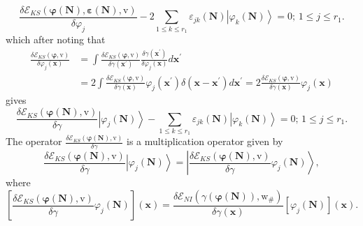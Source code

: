 \documentclass[aps,preprint]{revtex4}%
\begin{document}
\begin{equation}
\frac{\delta\mathcal{E}_{KS}\left(  \mathbf{\varphi}\left(  \mathbf{N}\right)
,\mathbf{\varepsilon}\left(  \mathbf{N}\right)  ,\mathrm{v}\right)  }%
{\delta\varphi_{j}}-2\sum_{1\leq k\leq r_{1}}\varepsilon_{jk}\left(
\mathbf{N}\right)  \left\vert \varphi_{k}\left(  \mathbf{N}\right)
\right\rangle =0;\,1\leq j\leq r_{1}.
\end{equation}
which after noting that
\begin{align}
\frac{\delta\mathcal{E}_{KS}\left(  \mathbf{\varphi,}\mathrm{v}\right)
}{\delta\varphi_{j}\left(  \mathbf{x}\right)  }  &  =\int\frac{\delta
\mathcal{E}_{KS}\left(  \mathbf{\varphi,}\mathrm{v}\right)  }{\delta
\gamma\left(  \mathbf{x}^{\prime}\right)  }\frac{\delta\gamma\left(
\mathbf{x}^{\prime}\right)  }{\delta\varphi_{j}\left(  \mathbf{x}\right)
}d\mathbf{x}^{\prime}\nonumber\\
&  =2\int\frac{\delta\mathcal{E}_{KS}\left(  \mathbf{\varphi,}\mathrm{v}%
\right)  }{\delta\gamma\left(  \mathbf{x}\right)  }\varphi_{j}\left(
\mathbf{x}^{\prime}\right)  \delta\left(  \mathbf{x-x}^{\prime}\right)
d\mathbf{x}^{\prime}=2\frac{\delta\mathcal{E}_{KS}\left(  \mathbf{\varphi
,}\mathrm{v}\right)  }{\delta\gamma\left(  \mathbf{x}\right)  }\varphi
_{j}\left(  \mathbf{x}\right)
\end{align}
gives%
\begin{equation}
\frac{\delta\mathcal{E}_{KS}\left(  \mathbf{\mathbf{\varphi}\left(
\mathbf{N}\right)  ,}\mathrm{v}\right)  }{\delta\gamma}\left\vert \varphi
_{j}\left(  \mathbf{N}\right)  \right\rangle -\sum_{1\leq k\leq r_{1}%
}\varepsilon_{jk}\left(  \mathbf{N}\right)  \left\vert \varphi_{k}\left(
\mathbf{N}\right)  \right\rangle =0;\,1\leq j\leq r_{1}.
\end{equation}
The operator $\frac{\delta\mathcal{E}_{KS}\left(  \mathbf{\mathbf{\varphi
}\left(  \mathbf{N}\right)  ,}\mathrm{v}\right)  }{\delta\gamma}$ is a
multiplication operator given by
\begin{equation}
\frac{\delta\mathcal{E}_{KS}\left(  \mathbf{\mathbf{\varphi}\left(
\mathbf{N}\right)  ,}\mathrm{v}\right)  }{\delta\gamma}\left\vert \varphi
_{j}\left(  \mathbf{N}\right)  \right\rangle =\left\vert \frac{\delta
\mathcal{E}_{KS}\left(  \mathbf{\mathbf{\varphi}\left(  \mathbf{N}\right)
,}\mathrm{v}\right)  }{\delta\gamma}\varphi_{j}\left(  \mathbf{N}\right)
\right\rangle ,
\end{equation}
where
\begin{equation}
\left[  \frac{\delta\mathcal{E}_{KS}\left(  \mathbf{\mathbf{\varphi}\left(
\mathbf{N}\right)  ,}\mathrm{v}\right)  }{\delta\gamma}\varphi_{j}\left(
\mathbf{N}\right)  \right]  \left(  \mathbf{x}\right)  =\frac{\delta
\mathcal{E}_{NI}\left(  \gamma\left(  \mathbf{\varphi}\left(  \mathbf{N}%
\right)  \right)  \mathbf{,}\mathrm{w}_{\#}\right)  }{\delta\gamma\left(
\mathbf{x}\right)  }\left[  \varphi_{j}\left(  \mathbf{N}\right)  \right]
\left(  \mathbf{x}\right)  .
\end{equation}
\end{document}
